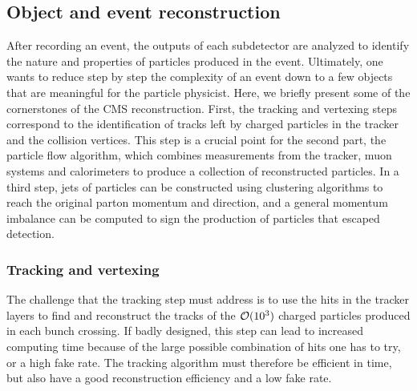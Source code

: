    \subsection{Object and event reconstruction}



    After recording an event, the outputs of each subdetector
    are analyzed to identify the nature and properties of particles produced in the
    event. Ultimately, one wants to reduce step by step the complexity of an event down to
    a few objects that are meaningful for the particle physicist. Here, we briefly present some of the
    cornerstones of the CMS reconstruction. First, the tracking and vertexing steps
    correspond to the identification of tracks left by charged particles in the tracker
    and the collision vertices. This step is a crucial point for the second part, the
    particle flow algorithm, which combines measurements from the tracker, muon systems
    and calorimeters to produce a collection of reconstructed particles. In a third step,
    jets of particles can be constructed using clustering algorithms to reach the original
    parton momentum and direction, and a general momentum imbalance can be computed
    to sign the production of particles that escaped detection.

        \subsubsection{Tracking and vertexing \label{sec:trackingAndVertexing}}

    The challenge that the tracking step must address is to use the hits in the
    tracker layers to find and reconstruct the tracks of the $\mathcal{O}(10^3)$ charged
    particles produced in each bunch crossing. If badly designed, this step can lead
    to increased computing time because of the large possible combination of hits one
    has to try, or a high fake rate. The tracking algorithm must therefore be efficient
    in time, but also have a good reconstruction efficiency and a low fake rate.

